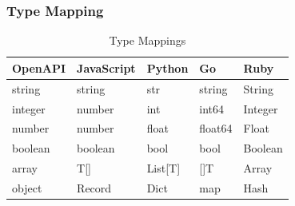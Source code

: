 \subsubsection{Type Mapping}

\begin{table}[h]
\centering
\caption{Type Mappings}
\begin{tabular}{lllll}
\toprule
\textbf{OpenAPI} & \textbf{JavaScript} & \textbf{Python} & \textbf{Go} & \textbf{Ruby} \\
\midrule
string & string & str & string & String \\
integer & number & int & int64 & Integer \\
number & number & float & float64 & Float \\
boolean & boolean & bool & bool & Boolean \\
array & T[] & List[T] & []T & Array \\
object & Record & Dict & map & Hash \\
\bottomrule
\end{tabular}
\end{table}

